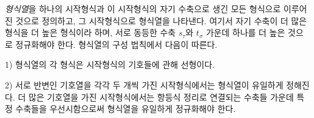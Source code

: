 
\emph{형식열}\setcounter{footnote}{9}을 하나의 시작형식과 이 시작형식의 자기 수축으로 생긴 모든 형식으로 이루어진 것으로 정의하고, 그 시작형식으로 형식열을 나타낸다. 여기서 자기 수축이 더 많은 형식을 \glqq{}더 높은 형식\grqq{}이라 하며, 서로 동등한 수축 $s_\tau$와 $t_\sigma$ 가운데 하나를 더 높은 것으로 정규화해야 한다. 형식열의 구성 법칙에서 다음이 따른다.

1) 형식열의 각 형식은 시작형식의 기호들에 관해 선형이다.

2) 서로 반변인 기호열을 각각 두 개씩 가진 시작형식에서는 형식열이 유일하게 정해진다. 더 많은 기호열을 가진 시작형식에서는 항등식 정리로 연결되는 수축들 가운데 특정 수축들을 우선시함으로써 형식열을 유일하게 정규화해야 한다.

